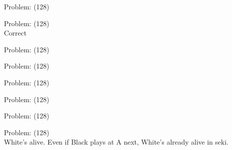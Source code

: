 \documentclass[11pt]{article}
\begin{document}
\begin{minipage}[t]{0.5\textwidth}
  {\centering
  
Problem: (128)\\
  }
\end{minipage}
\begin{minipage}[t]{0.5\textwidth}
  {\centering
  
Problem: (128)\\
Correct\\
  }
\end{minipage}
\begin{minipage}[t]{0.5\textwidth}
  {\centering
  
Problem: (128)\\
  }
\end{minipage}
\begin{minipage}[t]{0.5\textwidth}
  {\centering
  
Problem: (128)\\
  }
\end{minipage}
\begin{minipage}[t]{0.5\textwidth}
  {\centering
  
Problem: (128)\\
  }
\end{minipage}
\begin{minipage}[t]{0.5\textwidth}
  {\centering
  
Problem: (128)\\
  }
\end{minipage}
\begin{minipage}[t]{0.5\textwidth}
  {\centering
  
Problem: (128)\\
  }
\end{minipage}
\begin{minipage}[t]{0.5\textwidth}
  {\centering
  
Problem: (128)\\
White's alive. Even if Black plays at A next, White's already alive in seki.\\
  }
\end{minipage}
\end{document}
